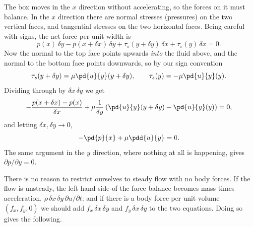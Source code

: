 \begin{center}
\end{center}

The box moves in the $x$ direction without accelerating, so the forces on it must balance. In the $x$ direction there are normal stresses (pressures) on the two vertical faces, and tangential stresses on the two horizontal faces. Being careful with signs, the net force per unit width is
$$
p(x)\,\delta y - p(x + \delta x)\, \delta y + \tau_s(y + \delta y)\,\delta x + \tau_s(y) \, \delta x = 0.
$$
Now the normal to the top face points upwards \emph{into} the fluid above, and the normal to the bottom face points downwards, so by our sign convention
$$
\tau_s(y + \delta y) = \mu \pd{u}{y}(y + \delta y), \qquad \tau_s(y) = -\mu \pd{u}{y}(y).
$$
Dividing through by $\delta x \, \delta y$ we get
$$
-\frac{p(x + \delta x) - p(x)}{\delta x} + \mu \frac{1}{\delta y} \left( \pd{u}{y}(y + \delta y) - \pd{u}{y}(y)\right) = 0,
$$
and letting $\delta x, \delta y \to 0$,
$$
- \pd{p}{x} + \mu \pdd{u}{y} = 0.
$$
The same argument in the $y$ direction, where nothing at all is happening, gives $\partial p / \partial y = 0$.

There is no reason to restrict ourselves to steady flow with no body forces. If the flow is unsteady, the left hand side of the force balance becomes mass times acceleration, $\rho \, \delta x \, \delta y \, \partial u / \partial t$; and if there is a body force per unit volume $(f_x, f_y, 0)$ we should add $f_x \, \delta x \, \delta y$ and $f_y \, \delta x \, \delta y$ to the two equations. Doing so gives the following.

